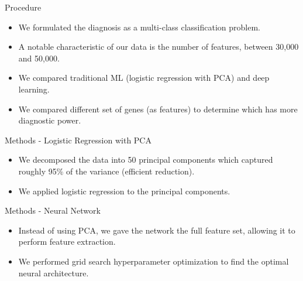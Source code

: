 \documentclass{beamer}
\begin{document}
    \begin{frame}{Procedure}
        \begin{itemize} \setlength\itemsep{15pt}
            \item {
                We formulated the diagnosis as a multi-class classification problem.
            }
            \item {
                A notable characteristic of our data is the number of features, between
                30,000 and 50,000.
            }
            \item {
                We compared traditional ML (logistic regression with PCA) 
                and deep learning.
            }
            \item {
                We compared different set of genes (as features) to determine which
                has more diagnostic power.
            }
        \end{itemize}
    \end{frame}

    \begin{frame}{Methods - Logistic Regression with PCA}
        \begin{itemize} \setlength\itemsep{15pt}
            \item {
                We decomposed the data into 50 principal components which captured
                roughly 95\% of the variance (efficient reduction).
            }
            \item {
                We applied logistic regression to the principal components.
            }
        \end{itemize}
    \end{frame}

    \begin{frame}{Methods - Neural Network}
        \begin{itemize} \setlength\itemsep{15pt}
            \item {
                Instead of using PCA, we gave the network the full feature set, allowing it to
                perform feature extraction.
            }
            \item {
                We performed grid search hyperparameter optimization to find the optimal neural
                architecture.
            }
        \end{itemize}
    \end{frame}
\end{document}
